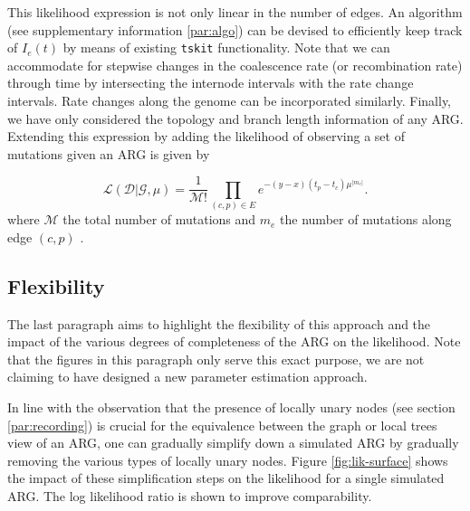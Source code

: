\documentclass{article}
\begin{document}
This likelihood expression is not only linear in the number of edges. An algorithm
(see supplementary information \ref{par:algo}) can be devised to efficiently keep
track of $I_e(t)$ by means of existing \texttt{tskit} functionality.
Note that we can accommodate for stepwise changes in the coalescence rate (or recombination rate)
through time by intersecting the internode intervals with the rate change intervals. 
Rate changes along the genome can be incorporated similarly.
Finally, we have only considered the topology and branch length information of any ARG.
Extending this expression by adding the likelihood of observing a set of mutations
given an ARG is given by

\begin{equation}\label{eq:lik-mut}
    \mathcal{L}(\mathcal{D}|\mathcal{G}, \mu)
    =
    \frac{1}{\mathcal{M}!} \prod_{(c, p) \in E} e^{-(y-x)(t_p-t_c)\mu^{|m_e|}} .
\end{equation}
where $\mathcal{M}$ the total number of mutations and $m_e$
the number of mutations along edge $(c,p)$ \citep{mahmoudi_bayesian_2022}.

\subsection{Flexibility}

The last paragraph aims to highlight the flexibility of this approach 
and the impact of the various
degrees of completeness of the ARG on the likelihood.
Note that the figures in this paragraph only serve this exact purpose,
we are not claiming to have designed a new parameter estimation approach.

In line with the observation that the presence of locally unary nodes 
(see section \ref{par:recording}) is crucial for the equivalence between
the graph or local trees view of an ARG, one can gradually simplify down
a simulated ARG by gradually removing the various types of locally unary nodes.
Figure \ref{fig:lik-surface} shows the impact of these simplification steps
on the likelihood for a single simulated ARG.
The log likelihood ratio is shown to improve comparability.
\end{document}
